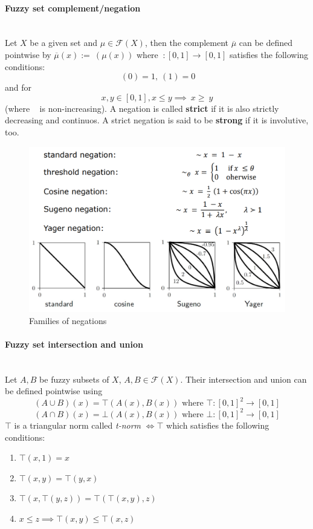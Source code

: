 \documentclass{article}
\begin{document}
\paragraph{Fuzzy set complement/negation}\mbox{}\\
Let $X$ be a given set and $\mu\in\mathcal{F}(X)$, then the complement $\overline{\mu}$ can be
defined pointwise by $\overline{\mu}(x):=~(\mu(x))$ where $~:[0,1]\rightarrow [0,1]$
satisfies the following conditions:
$$~(0)=1,~(1)=0$$
and for $$x,y\in [0,1],x\leq y\implies ~x\geq ~y$$ (where ~ is non-increasing).
\newline\newline
A negation is called \textbf{strict} if it is also strictly decreasing and continuos. A strict
negation is said to be \textbf{strong} if it is involutive, too.
\begin{figure}[H]
    \centering
    \includegraphics[scale=0.45]{images/neg-families.png}
    \caption{Families of negations}
\end{figure}

\paragraph{Fuzzy set intersection and union}\mbox{}\\
Let $A,B$ be fuzzy subsets of $X$, $A,B\in\mathcal{F}(X)$. Their intersection and union can be
defined pointwise using
$$(A\cup B)(x) = \top(A(x),B(x))\text{ where }\top:[0,1]^2\rightarrow [0,1]$$
$$(A\cap B)(x) = \bot(A(x),B(x))\text{ where }\bot:[0,1]^2\rightarrow [0,1]$$
\noindent$\top$ is a triangular norm called \textit{t-norm} $\Longleftrightarrow\top$ which satisfies
the following conditions:
\begin{enumerate}
    \item $\top (x,1)=x$
    \item $\top(x,y)=\top(y,x)$
    \item $\top(x,\top(y,z))=\top(\top(x,y),z)$
    \item $x\leq z\implies \top(x,y)\leq\top(x,z)$
\end{enumerate}
\end{document}
